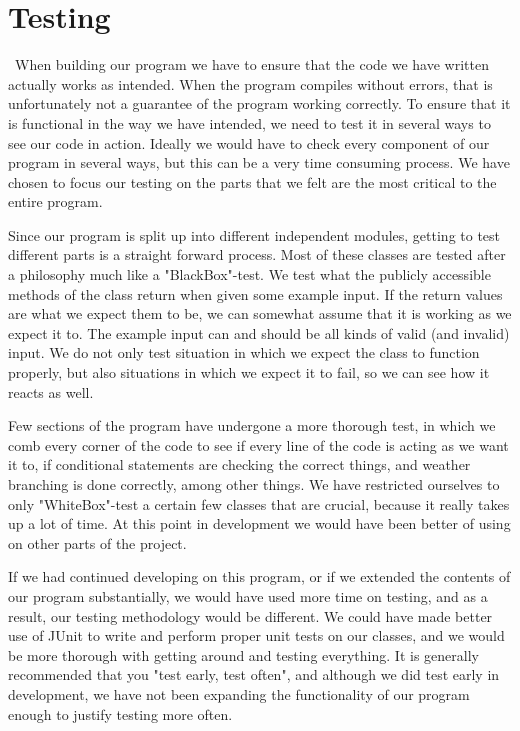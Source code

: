 \documentclass[a4paper,10pt,titlepage]{article}
\begin{document}
		
	\newpage
	\section{Testing}\mbox{}\
	When building our program we have to ensure that the code we have written actually works as intended. When the program compiles without errors, that is unfortunately not a guarantee of the program working correctly. To ensure that it is functional in the way we have intended, we need to test it in several ways to see our code in action. Ideally we would have to check every component of our program in several ways, but this can be a very time consuming process. We have chosen to focus our testing on the parts that we felt are the most critical to the entire program.

Since our program is split up into different independent modules, getting to test different parts is a straight forward process. Most of these classes are tested after a philosophy much like a "BlackBox"-test. We test what the publicly accessible methods of the class return when given some example input. If the return values are what we expect them to be, we can somewhat assume that it is working as we expect it to. The example input can and should be all kinds of valid (and invalid) input. We do not only test situation in which we expect the class to function properly, but also situations in which we expect it to fail, so we can see how it reacts as well.

Few sections of the program have undergone a more thorough test, in which we comb every corner of the code to see if every line of the code is acting as we want it to, if conditional statements are checking the correct things, and weather branching is done correctly, among other things. We have restricted ourselves to only "WhiteBox"-test a certain few classes that are crucial, because it really takes up a lot of time. At this point in development we would have been better of using on other parts of the project.

If we had continued developing on this program, or if we extended the contents of our program substantially, we would have used more time on testing, and as a result, our testing methodology would be different. We could have made better use of JUnit to write and perform proper unit tests on our classes, and we would be more thorough with getting around and testing everything. It is generally recommended that you "test early, test often", and although we did test early in development, we have not been expanding the functionality of our program enough to justify testing more often. 
\end{document}
